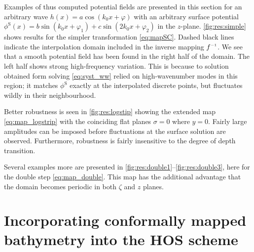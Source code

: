\documentclass[a4paper,12pt]{article}
\newcommand{\mr}{\mathrm}
\renewcommand{\S}{^\mr{S}}
\renewcommand{\_}[1]{_\mr{#1}}
\newcommand{\z}{z}
\newcommand{\x}{x}
\newcommand{\y}{y}
\newcommand{\zz}{\zeta}
\newcommand{\yy}{\sigma}
\newcommand{\zmap}{f}
\newcommand{\zzmap}{\zmap^{\raisebox{.2ex}{$\scriptscriptstyle-1$}}}
\begin{document}
Examples of thus computed potential fields are presented in this section for an arbitrary wave $h(\x) = a\cos(k_0 \x + \varphi)$ with an arbitrary surface potential $\phi\S(\x) = b\sin(k_0 \x + \varphi_1) + c\sin(2k_0 \x + \varphi_2)$ in the $\z$-plane.
\autoref{fig:res:simple} shows results for the simpler transformation \eqref{eq:mapSC}.
Dashed black lines indicate the interpolation domain included in the inverse mapping $\zzmap$.
We see that a smooth potential field has been found in the right half of the domain. 
The left half shows strong high-frequency variation. 
This is because to solution obtained form solving \eqref{eq:syst_ww} relied on high-wavenumber modes in this region; it matches $\phi\S$ exactly at the interpolated discrete points, but fluctuates wildly in their neighbourhood.

Better robustness is seen in \autoref{fig:res:logstip} showing the extended map \eqref{eq:map_logstrip} with the coinciding flat planes $\yy=0$ where $\y=0$. 
Fairly large amplitudes can be imposed before fluctuations at the surface solution are observed. 
Furthermore, robustness is fairly insensitive to the degree of depth transition.

Several examples more are presented in \autoref{fig:res:double1}--\ref{fig:res:double3}, here for the double step \eqref{eq:map_double}.
This map has the additional advantage that the domain becomes periodic in both $\zz$ and $\z$ planes.



\section{Incorporating conformally mapped bathymetry into the HOS scheme}
\end{document}
